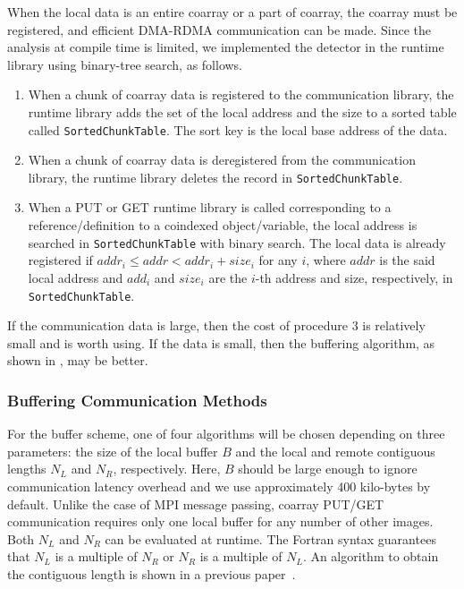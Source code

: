 When the local data is an entire coarray or a part of coarray,
the coarray must be registered, and efficient DMA-RDMA communication can 
be made. Since the analysis at compile time is limited,
we implemented the detector in the runtime library 
using binary-tree search, as follows.
%
\begin{enumerate}
\item
When a chunk of coarray data is registered to the communication library, 
the runtime library adds the set of the local address and the size to a sorted 
table called {\tt SortedChunkTable}. The sort key is the local base address
of the data.
\item
When a chunk of coarray data is deregistered from the communication library, the 
runtime library deletes the record in {\tt SortedChunkTable}.
\item
When a PUT or GET runtime library is called corresponding to a reference/definition
to a coindexed object/variable, the local address is searched in {\tt SortedChunkTable}
with binary search. The local data is already registered if 
$addr_i \leq addr < addr_i + size_i$ for any $i$,
where $addr$ is the said local address and $add_i$ and $size_i$ are the
$i$-th address and size, respectively, in {\tt SortedChunkTable}.
\end{enumerate}

If the communication data is large, then the cost of procedure 3 is relatively small
and is worth using. 
If the data is small, then the buffering algorithm, as shown in , may be better.


\subsubsection{Buffering Communication Methods}\label{sec:buffer}

For the buffer scheme, one of four algorithms will be chosen 
depending on three parameters: the size of the local buffer $B$ and the 
local and remote contiguous lengths $N_L$ and $N_R$, respectively.
Here, $B$ should be large enough to ignore communication latency overhead and we use
approximately 400 kilo-bytes by default. Unlike the case of MPI message passing,
coarray PUT/GET communication requires only one local buffer for any number of
other images.
Both $N_L$ and $N_R$ can be evaluated at runtime. The Fortran syntax guarantees 
that $N_L$ is a multiple of $N_R$ or $N_R$ is a multiple of $N_L$.
An algorithm to obtain the contiguous length is shown in a previous paper~\cite{pgas15}.

